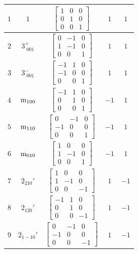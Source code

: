\documentclass[fleqn,8pt]{jsarticle}
\begin{document}
\begin{longtable}{ccccc}
$ 1 $ & $ 1 $ & $ \begin{bmatrix} 1 & 0 & 0 \\ 0 & 1 & 0 \\ 0 & 0 & 1 \end{bmatrix} $ & $ 1 $ & $ 1 $ \\ \hline
$ 2 $ & $ 3^{+}_{\,\,001} $ & $ \begin{bmatrix} 0 & -1 & 0 \\ 1 & -1 & 0 \\ 0 & 0 & 1 \end{bmatrix} $ & $ 1 $ & $ 1 $ \\ \hline
$ 3 $ & $ 3^{-}_{\,\,001} $ & $ \begin{bmatrix} -1 & 1 & 0 \\ -1 & 0 & 0 \\ 0 & 0 & 1 \end{bmatrix} $ & $ 1 $ & $ 1 $ \\ \hline
$ 4 $ & $ {\rm m}_{100} $ & $ \begin{bmatrix} -1 & 1 & 0 \\ 0 & 1 & 0 \\ 0 & 0 & 1 \end{bmatrix} $ & $ -1 $ & $ 1 $ \\ \hline
$ 5 $ & $ {\rm m}_{110} $ & $ \begin{bmatrix} 0 & -1 & 0 \\ -1 & 0 & 0 \\ 0 & 0 & 1 \end{bmatrix} $ & $ -1 $ & $ 1 $ \\ \hline
$ 6 $ & $ {\rm m}_{010} $ & $ \begin{bmatrix} 1 & 0 & 0 \\ 1 & -1 & 0 \\ 0 & 0 & 1 \end{bmatrix} $ & $ -1 $ & $ 1 $ \\ \hline
$ 7 $ & $ 2{}_{210}{}' $ & $ \begin{bmatrix} 1 & 0 & 0 \\ 1 & -1 & 0 \\ 0 & 0 & -1 \end{bmatrix} $ & $ 1 $ & $ -1 $ \\ \hline
$ 8 $ & $ 2{}_{120}{}' $ & $ \begin{bmatrix} -1 & 1 & 0 \\ 0 & 1 & 0 \\ 0 & 0 & -1 \end{bmatrix} $ & $ 1 $ & $ -1 $ \\ \hline
$ 9 $ & $ 2{}_{1-10}{}' $ & $ \begin{bmatrix} 0 & -1 & 0 \\ -1 & 0 & 0 \\ 0 & 0 & -1 \end{bmatrix} $ & $ 1 $ & $ -1 $ \\ \hline

\end{longtable}
\end{document}

